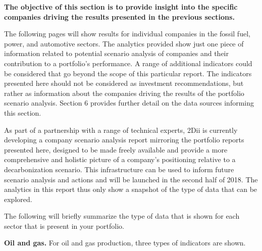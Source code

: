 \documentclass[10pt,table,a4]{article}\usepackage[]{graphicx}\usepackage[]{color}
\begin{document}
	\begin{multicols}{2}
		
		\textbf{The objective of this section is to provide insight into the specific companies driving the results presented in the previous sections.}
		
		The following pages will show results for individual companies in the fossil fuel, power, and automotive sectors. The analytics provided show just one piece of information related to potential scenario analysis of companies and their contribution to a portfolio's performance. A range of additional indicators could be considered that go beyond the scope of this particular report. The indicators presented here should not be considered as investment recommendations, but rather as information about the companies driving the results of the portfolio scenario analysis. Section 6 provides further detail on the data sources informing this section. 
		
		As part of a partnership with a range of technical experts, 2Dii is currently developing a company scenario analysis report mirroring the portfolio reports presented here, designed to be made freely available and provide a more comprehensive and holistic picture of a company's positioning relative to a decarbonization scenario. This infrastructure can be used to inform future scenario analysis and actions and will be launched in the second half of 2018. The analytics in this report thus only show a snapshot of the type of data that can be explored. 
		
		The following will briefly summarize the type of data that is shown for each sector that is present in your portfolio. 
		
		\textbf{Oil and gas.} For oil and gas production, three types of indicators are shown. 
		

\end{multicols}
\end{document}

